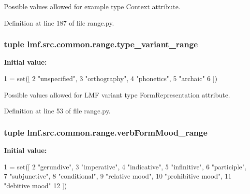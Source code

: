 Possible values allowed for example type Context attribute. 



Definition at line 187 of file range.\+py.

\hypertarget{namespacelmf_1_1src_1_1common_1_1range_a58f5cff733c3b357e42d3ce87c7080a0}{
\subsubsection[{type\+\_\+variant\+\_\+range}]{\setlength{\rightskip}{0pt plus 5cm}tuple lmf.\+src.\+common.\+range.\+type\+\_\+variant\+\_\+range}}\label{namespacelmf_1_1src_1_1common_1_1range_a58f5cff733c3b357e42d3ce87c7080a0}
{\bfseries Initial value\+:}
\begin{DoxyCode}
1 = set([
2     \textcolor{stringliteral}{"unspecified"},
3     \textcolor{stringliteral}{"orthography"},
4     \textcolor{stringliteral}{"phonetics"},
5     \textcolor{stringliteral}{"archaic"}
6 ])
\end{DoxyCode}


Possible values allowed for L\+M\+F variant type Form\+Representation attribute. 



Definition at line 53 of file range.\+py.

\hypertarget{namespacelmf_1_1src_1_1common_1_1range_a5a57dc7ed7fa1f785e812cfe2c306ef6}{
\subsubsection[{verb\+Form\+Mood\+\_\+range}]{\setlength{\rightskip}{0pt plus 5cm}tuple lmf.\+src.\+common.\+range.\+verb\+Form\+Mood\+\_\+range}}\label{namespacelmf_1_1src_1_1common_1_1range_a5a57dc7ed7fa1f785e812cfe2c306ef6}
{\bfseries Initial value\+:}
\begin{DoxyCode}
1 = set([
2     \textcolor{stringliteral}{"gerundive"},
3     \textcolor{stringliteral}{"imperative"},
4     \textcolor{stringliteral}{"indicative"},
5     \textcolor{stringliteral}{"infinitive"},
6     \textcolor{stringliteral}{"participle"},
7     \textcolor{stringliteral}{"subjunctive"},
8     \textcolor{stringliteral}{"conditional"},
9     \textcolor{stringliteral}{"relative mood"},
10     \textcolor{stringliteral}{"prohibitive mood"},
11     \textcolor{stringliteral}{"debitive mood"}
12 ])
\end{DoxyCode}


